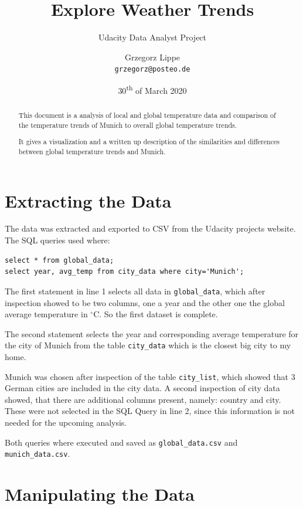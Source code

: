 \documentclass[DIV=11, a4paper, parskip=true]{scrartcl}
\author{Grzegorz Lippe\\
{\small \texttt{grzegorz@posteo.de}}}
\title{Explore Weather Trends}
\subtitle{Udacity Data Analyst Project}
\date{30\textsuperscript{th} of March 2020}
\begin{document}
\maketitle

\begin{abstract}
This document is a analysis of local and global temperature data and comparison of
the temperature trends of Munich to overall global temperature trends.

It gives a visualization and a written up description of the similarities and differences
between global temperature trends and Munich.
\end{abstract}

\tableofcontents

\section{Extracting the Data}
The data was extracted and exported to CSV from the Udacity projects website. The SQL queries
used where:

\lstset{language=SQL, basicstyle=\ttm, numbers=left}
\begin{lstlisting}[caption=SQL queries]
select * from global_data;
select year, avg_temp from city_data where city='Munich';
\end{lstlisting}

The first statement in line 1 selects all data in \texttt{global\_data}, which after inspection
showed to be two columns, one a year and the other one the global average temperature in
$^\circ$C. So the first dataset is complete.

The second statement selects the year and corresponding average temperature for the city of
Munich from the table \texttt{city\_data} which is the closest big city to my home.

Munich was chosen after inspection of the table \texttt{city\_list}, which showed that 3
German cities are included in the city data. A second inspection of city data showed, that
there are additional columns present, namely: country and city. These were not selected in
the SQL Query in line 2, since this information is not needed for the upcoming analysis.

Both queries where executed and saved as \texttt{global\_data.csv} and
\texttt{munich\_data.csv}.

\section{Manipulating the Data}
\end{document}
